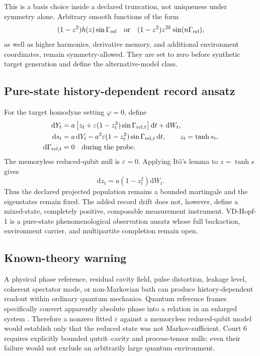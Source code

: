\documentclass[10pt]{article}
\theoremstyle{definition}
\theoremstyle{remark}
\newcommand{\dd}{\mathrm d}
\begin{document}
This is a basis choice inside a declared truncation, not uniqueness under symmetry alone. Arbitrary smooth functions of the form
\[
(1-z^2)h(z)\sin\Gamma_{\rm rel}
\quad\text{or}\quad
(1-z^2)z^{2k}\sin(n\Gamma_{\rm rel}),
\]
as well as higher harmonics, derivative memory, and additional environment coordinates, remain symmetry-allowed. They are set to zero before synthetic target generation and define the alternative-model class.

\subsection{Pure-state history-dependent record ansatz}

For the target homodyne setting \(\varphi=0\), define
\begin{align}
  \dd Y_t
  &=
  a\left[
  z_t+\varepsilon(1-z_t^2)\sin\Gamma_{{\rm rel},t}
  \right]\dd t+\dd W_t,
  \label{eq:epr-record}\\
  \dd s_t
  &=a\,\dd Y_t
  -a^2\varepsilon(1-z_t^2)
  \sin\Gamma_{{\rm rel},t}\,\dd t,
  \qquad z_t=\tanh s_t,
  \label{eq:epr-s}\\
  \dd\Gamma_{{\rm rel},t}&=0
  \quad\text{during the probe}.
  \label{eq:epr-holonomy}
\end{align}
The memoryless reduced-qubit null is \(\varepsilon=0\). Applying It\^o's lemma to \(z=\tanh s\) gives
\begin{equation}
  \dd z_t
  =
  a(1-z_t^2)\dd W_t.
  \label{eq:epr-z}
\end{equation}
Thus the declared projected population remains a bounded martingale and the eigenstates remain fixed. The added record drift does not, however, define a mixed-state, completely positive, composable measurement instrument. VD-Hopf-1 is a pure-state phenomenological observation ansatz whose full backaction, environment carrier, and multipartite completion remain open.

\subsection{Known-theory warning}

A physical phase reference, residual cavity field, pulse distortion, leakage level, coherent spectator mode, or non-Markovian bath can produce history-dependent readout within ordinary quantum mechanics. Quantum reference frames specifically convert apparently absolute phase into a relation in an enlarged system \citep{Bartlett2007,Loveridge2018}. Therefore a nonzero fitted \(\varepsilon\) against a memoryless reduced-qubit model would establish only that the reduced state was not Markov-sufficient. Court 6 requires explicitly bounded qutrit--cavity and process-tensor nulls; even their failure would not exclude an arbitrarily large quantum environment.
\end{document}
